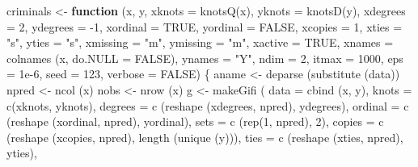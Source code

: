 \documentclass[
  12pt,
]{book}
\newenvironment{Shaded}{\begin{snugshade}}{\end{snugshade}}
\newcommand{\AttributeTok}[1]{\textcolor[rgb]{0.77,0.63,0.00}{#1}}
\newcommand{\ConstantTok}[1]{\textcolor[rgb]{0.00,0.00,0.00}{#1}}
\newcommand{\ControlFlowTok}[1]{\textcolor[rgb]{0.13,0.29,0.53}{\textbf{#1}}}
\newcommand{\DecValTok}[1]{\textcolor[rgb]{0.00,0.00,0.81}{#1}}
\newcommand{\FloatTok}[1]{\textcolor[rgb]{0.00,0.00,0.81}{#1}}
\newcommand{\FunctionTok}[1]{\textcolor[rgb]{0.00,0.00,0.00}{#1}}
\newcommand{\NormalTok}[1]{#1}
\newcommand{\OtherTok}[1]{\textcolor[rgb]{0.56,0.35,0.01}{#1}}
\newcommand{\SpecialCharTok}[1]{\textcolor[rgb]{0.00,0.00,0.00}{#1}}
\newcommand{\StringTok}[1]{\textcolor[rgb]{0.31,0.60,0.02}{#1}}
\begin{document}
\begin{Shaded}
\begin{Highlighting}[]
\NormalTok{criminals }\OtherTok{\textless{}{-}}
  \ControlFlowTok{function}\NormalTok{ (x,}
\NormalTok{            y,}
            \AttributeTok{xknots =} \FunctionTok{knotsQ}\NormalTok{(x),}
            \AttributeTok{yknots =} \FunctionTok{knotsD}\NormalTok{(y),}
            \AttributeTok{xdegrees =} \DecValTok{2}\NormalTok{,}
            \AttributeTok{ydegrees =} \SpecialCharTok{{-}}\DecValTok{1}\NormalTok{,}
            \AttributeTok{xordinal =} \ConstantTok{TRUE}\NormalTok{,}
            \AttributeTok{yordinal =} \ConstantTok{FALSE}\NormalTok{,}
            \AttributeTok{xcopies =} \DecValTok{1}\NormalTok{,}
            \AttributeTok{xties =} \StringTok{"s"}\NormalTok{,}
            \AttributeTok{yties =} \StringTok{"s"}\NormalTok{,}
            \AttributeTok{xmissing =} \StringTok{"m"}\NormalTok{,}
            \AttributeTok{ymissing =} \StringTok{"m"}\NormalTok{,}
            \AttributeTok{xactive =} \ConstantTok{TRUE}\NormalTok{,}
            \AttributeTok{xnames =} \FunctionTok{colnames}\NormalTok{ (x, }\AttributeTok{do.NULL =} \ConstantTok{FALSE}\NormalTok{),}
            \AttributeTok{ynames =} \StringTok{"Y"}\NormalTok{,}
            \AttributeTok{ndim =} \DecValTok{2}\NormalTok{,}
            \AttributeTok{itmax =} \DecValTok{1000}\NormalTok{,}
            \AttributeTok{eps =} \FloatTok{1e{-}6}\NormalTok{,}
            \AttributeTok{seed =} \DecValTok{123}\NormalTok{,}
            \AttributeTok{verbose =} \ConstantTok{FALSE}\NormalTok{) \{}
\NormalTok{    aname }\OtherTok{\textless{}{-}} \FunctionTok{deparse}\NormalTok{ (}\FunctionTok{substitute}\NormalTok{ (data))}
\NormalTok{    npred }\OtherTok{\textless{}{-}} \FunctionTok{ncol}\NormalTok{ (x)}
\NormalTok{    nobs }\OtherTok{\textless{}{-}} \FunctionTok{nrow}\NormalTok{ (x)}
\NormalTok{    g }\OtherTok{\textless{}{-}} \FunctionTok{makeGifi}\NormalTok{ (}
      \AttributeTok{data =} \FunctionTok{cbind}\NormalTok{ (x, y),}
      \AttributeTok{knots =} \FunctionTok{c}\NormalTok{(xknots, yknots),}
      \AttributeTok{degrees =} \FunctionTok{c}\NormalTok{ (}\FunctionTok{reshape}\NormalTok{ (xdegrees, npred), ydegrees),}
      \AttributeTok{ordinal =} \FunctionTok{c}\NormalTok{ (}\FunctionTok{reshape}\NormalTok{ (xordinal, npred), yordinal),}
      \AttributeTok{sets =}  \FunctionTok{c}\NormalTok{ (}\FunctionTok{rep}\NormalTok{(}\DecValTok{1}\NormalTok{, npred), }\DecValTok{2}\NormalTok{),}
      \AttributeTok{copies =} \FunctionTok{c}\NormalTok{ (}\FunctionTok{reshape}\NormalTok{ (xcopies, npred), }\FunctionTok{length}\NormalTok{ (}\FunctionTok{unique}\NormalTok{ (y))),}
      \AttributeTok{ties =} \FunctionTok{c}\NormalTok{ (}\FunctionTok{reshape}\NormalTok{ (xties, npred), yties),}

\end{Highlighting}
\end{Shaded}
\end{document}
